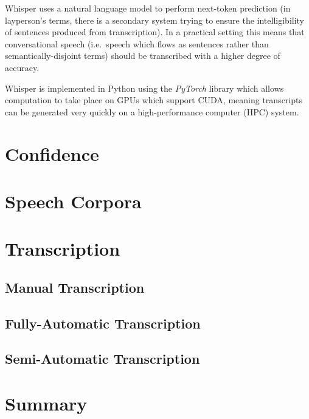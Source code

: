 Whisper uses a natural language model to perform next-token prediction (in layperson's terms, there is a secondary system trying to ensure the intelligibility of sentences produced from transcription).
In a practical setting this means that conversational speech (i.e.\ speech which flows as sentences rather than semantically-disjoint terms) should be transcribed with a higher degree of accuracy.

Whisper is implemented in Python using the \emph{PyTorch}\cite{pytorch} library which allows computation to take place on GPUs which support CUDA, meaning transcripts can be generated very quickly on a high-performance computer (HPC) system.

\section{Confidence}

\section{Speech Corpora}\label{sec:}

\section{Transcription}\label{sec:transcription}

\subsection{Manual Transcription}\label{subsec:manual-transcription}

\subsection{Fully-Automatic Transcription}\label{subsec:full-auto-transcription}

\subsection{Semi-Automatic Transcription}\label{subsec:semi-auto-transcription}

\section{Summary}\label{sec:lit-survey-summary}
\mycomment{
    }
